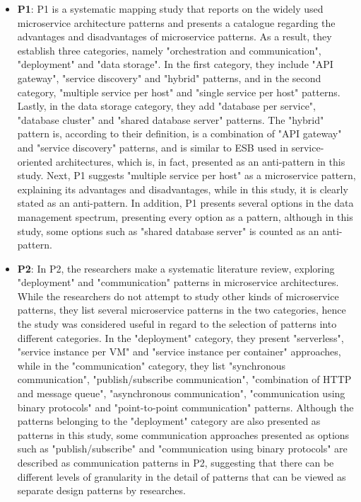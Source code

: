 \documentclass{Configuration_Files/PoliMi3i_thesis}
\begin{document}
\begin{itemize}
    \item \textbf{P1}: P1 is a systematic mapping study that reports on the widely used microservice architecture patterns and presents a catalogue regarding the advantages and disadvantages of microservice patterns.
    As a result, they establish three categories, namely "orchestration and communication", "deployment" and "data storage".
    In the first category, they include "API gateway", "service discovery" and "hybrid" patterns, and in the second category, "multiple service per host" and "single service per host" patterns.
    Lastly, in the data storage category, they add "database per service", "database cluster" and "shared database server" patterns.
    The "hybrid" pattern is, according to their definition, is a combination of "API gateway" and "service discovery" patterns, and is similar to ESB used in service-oriented architectures, which is, in fact, presented as an anti-pattern in this study.
    Next, P1 suggests "multiple service per host" as a microservice pattern, explaining its advantages and disadvantages, while in this study, it is clearly stated as an anti-pattern.
    In addition, P1 presents several options in the data management spectrum, presenting every option as a pattern, although in this study, some options such as "shared database server" is counted as an anti-pattern.
    
    \item \textbf{P2}: In P2, the researchers make a systematic literature review, exploring "deployment" and "communication" patterns in microservice architectures.
    While the researchers do not attempt to study other kinds of microservice patterns, they list several microservice patterns in the two categories, hence the study was considered useful in regard to the selection of patterns into different categories.
    In the "deployment" category, they present "serverless", "service instance per VM" and "service instance per container" approaches, while in the "communication" category, they list "synchronous communication", "publish/subscribe communication", "combination of HTTP and message queue", "asynchronous communication", "communication using binary protocols" and "point-to-point communication" patterns.
    Although the patterns belonging to the "deployment" category are also presented as patterns in this study, some communication approaches presented as options such as "publish/subscribe" and "communication using binary protocols" are described as communication patterns in P2, suggesting that there can be different levels of granularity in the detail of patterns that can be viewed as separate design patterns by researches.
    

\end{itemize}
\end{document}
